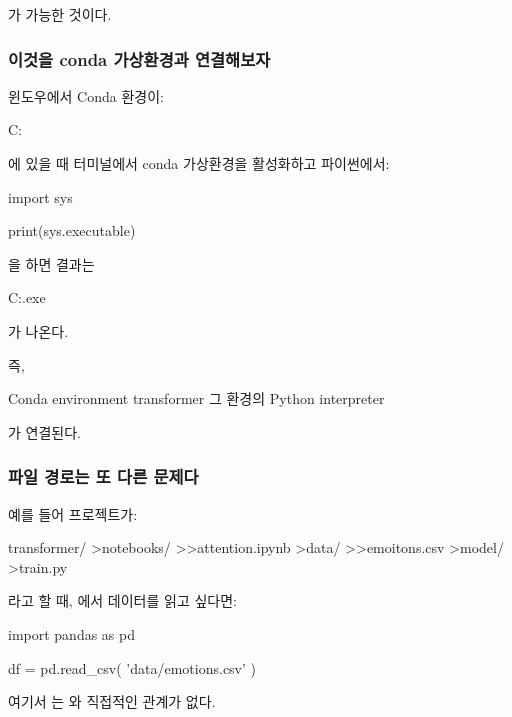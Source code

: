 가 가능한 것이다.

\subsubsection{이것을 conda 가상환경과 연결해보자}

윈도우에서 Conda 환경이:

\begin{dhkzsh}
C:\Users\user{}\envs\transformer\
\end{dhkzsh}

에 있을 때 터미널에서 conda 가상환경을 활성화하고 파이썬에서:

\begin{dhkcode}
import sys

print(sys.executable)
\end{dhkcode}

을 하면 결과는

\begin{dhkzsh}
C:\Users\user{}\envs\transformer\python.exe
\end{dhkzsh}

가 나온다.

즉,

\begin{dhksmry}[centered]
Conda environment
\da
transformer
\da
그 환경의 Python interpreter
\da
{}
\end{dhksmry}

가 연결된다.

\subsubsection{파일 경로는 또 다른 문제다}

예를 들어 프로젝트가:

\begin{dhkdir}[in=8]
transformer/
>notebooks/
>>attention.ipynb
>data/
>>emoitons.csv
>model/
>train.py
\end{dhkdir}

라고 할 때, 에서 데이터를 읽고 싶다면:

\begin{dhkcode}
import pandas as pd

df = pd.read_csv(
    'data/emotions.csv'
)
\end{dhkcode}

여기서 는 와 직접적인 관계가 없다.

